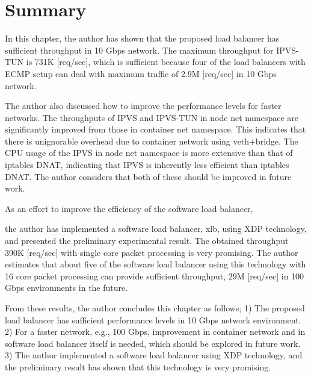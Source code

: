 \FloatBarrier

\section{Summary}


In this chapter, the author has shown that the proposed load balancer has sufficient throughput in 10 Gbps network.
The maximum throughput for IPVS-TUN is 731K [req/sec], which is sufficient because four of the load balancers with ECMP setup can deal with maximum traffic of 2.9M [req/sec] in 10 Gbps network.



The author also discussed how to improve the performance levels for faster networks.
The throughputs of IPVS and IPVS-TUN in node net namespace are significantly improved from those in container net namespace.
This indicates that there is unignorable overhead due to container network using veth+bridge.
The CPU usage of the IPVS in node net namespace is more extensive than that of iptables DNAT, indicating that IPVS is inherently less efficient than iptables DNAT.
The author considers that both of these should be improved in future work.



As an effort to improve the efficiency of the software load balancer, 

the author has implemented a software load balancer, xlb, using XDP technology, and presented the preliminary experimental result.
The obtained throughput 390K [req/sec] with single core packet processing is very promising.
The author estimates that about five of the software load balancer using this technology with 16 core packet processing can provide sufficient throughput, 29M [req/sec] in 100 Gbps environments in the future. 







From these results, the author concludes this chapter as follows;
1) The proposed load balancer has sufficient performance levels in 10 Gbps network environment.
2) For a faster network, e.g., 100 Gbps, improvement in container network and in software load balancer itself is needed, which should be explored in future work.
3) The author implemented a software load balancer using XDP technology, and the preliminary result has shown that this technology is very promising.


